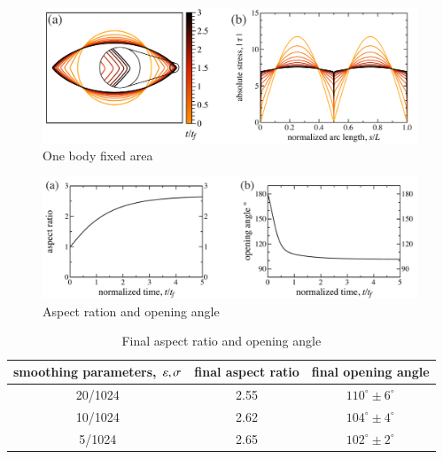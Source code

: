 \documentclass[preprint, 10pt]{elsarticle}
\begin{document}
\begin{figure}%
\begin{center}
\includegraphics[width = 0.8 \textwidth]{./figs/fixed_intface.pdf}
\caption{One body fixed area}
\label{}
\end{center}
\end{figure}

\begin{figure}%
\begin{center}
\includegraphics[width = 0.8 \textwidth]{./figs/arangle.pdf}
\caption{Aspect ration and opening angle}
\label{}
\end{center}
\end{figure}


\begin{table}%
\begin{center}
\caption{Final aspect ratio and opening angle
} 
\vspace{0.3 pc}
\begin{tabular}{c c c}
\hline
\hspace{0.5pc} smoothing parameters, $\varepsilon, \sigma$
\hspace{0.5pc} & final aspect ratio 
\hspace{0.5pc} & final opening angle \\
\hline
20/1024		& 2.55	& $110^\circ \pm 6^\circ$	\\
10/1024		& 2.62	& $104^\circ \pm 4^\circ$	\\
5/1024		& 2.65	& $102^\circ \pm 2^\circ$	\\
\hline
\end{tabular}
\end{center}
\end{table}
\end{document}
